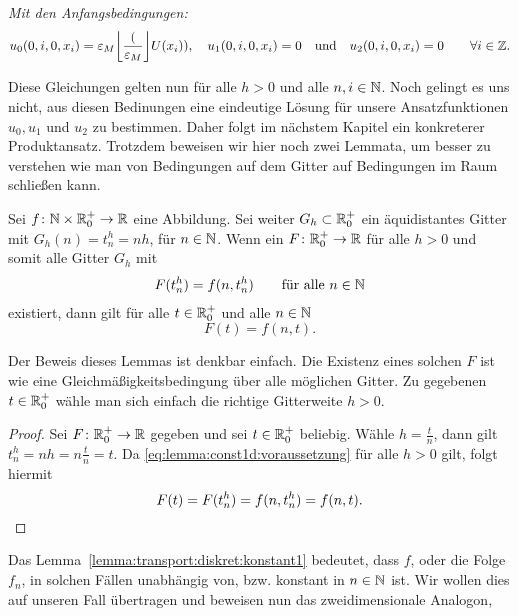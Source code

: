 \vspace{0.4cm}
\noindent \emph{Mit den Anfangsbedingungen:}
\begin{align}\label{eq:transport:diskret:anfangsbedinungen}
u_0(0, i, 0, x_i) = \rd(U(x_i)), \quad u_1(0, i, 0, x_i) = 0 \quad \text{und} \quad u_2(0, i, 0, x_i) = 0 \qquad \forall i \in \Z.
\end{align}

Diese Gleichungen gelten nun für alle $h > 0$ und alle $n, i \in \mathbb N$.
Noch gelingt es uns nicht, aus diesen Bedinungen eine eindeutige Lösung für unsere Ansatzfunktionen $u_0, u_1$ und $u_2$ zu bestimmen.
Daher folgt im nächstem Kapitel ein konkreterer Produktansatz.
Trotzdem beweisen wir hier noch zwei Lemmata, um besser zu verstehen wie man von Bedingungen auf dem Gitter auf Bedingungen im Raum schließen kann.

\begin{lemma} \label{lemma:transport:diskret:konstant1}
Sei $f\colon \mathbb N \times \mathbb R^+_0 \to \mathbb R$ eine Abbildung.
Sei weiter $G_h \subset \mathbb R^+_0$ ein äquidistantes Gitter mit $G_h(n) = t^h_n = n h$, für $n \in \mathbb N$.
Wenn ein $F\colon \mathbb R^+_0 \to \mathbb R$ für alle $h > 0$ und somit alle Gitter $G_h$ mit
\begin{align}\label{eq:lemma:const1d:voraussetzung}
F(t^h_n) = f(n, t^h_n) \qquad \text{für alle $n \in \mathbb N$}
\end{align}
existiert, dann gilt für alle $t \in \mathbb R^+_0$ und alle $n \in \mathbb N$
\[ F(t) = f(n, t). \]
\end{lemma}
Der Beweis dieses Lemmas ist denkbar einfach. Die Existenz eines solchen $F$ ist wie eine Gleichmäßigkeitsbedingung über alle möglichen Gitter.
Zu gegebenen $t \in \mathbb R^+_0$ wähle man sich einfach die richtige Gitterweite $h > 0$.
\begin{proof}
Sei $F\colon \mathbb R^+_0 \to \mathbb R$ gegeben und sei $t \in \mathbb R^+_0$ beliebig.
Wähle $h = \frac{t}{n}$, dann gilt $t^h_n = nh = n \frac{t}{n} = t$.
Da \eqref{eq:lemma:const1d:voraussetzung} für alle $h > 0$ gilt, folgt hiermit 
\[ F(t) = F(t^h_n) = f(n, t^h_n) = f(n, t). \qedhere \]
\end{proof}

Das Lemma~\ref{lemma:transport:diskret:konstant1} bedeutet, dass $f$, oder die Folge $f_n$, in solchen Fällen unabhängig von, bzw. konstant in $n \in \mathbb N$ ist.
Wir wollen dies auf unseren Fall übertragen und beweisen nun das zweidimensionale Analogon, 

